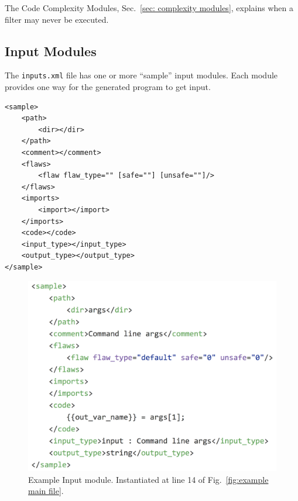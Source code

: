 The Code Complexity Modules, Sec.~\ref{sec: complexity modules}, explains when a
filter may never be executed.


\subsection{Input Modules}
\label{sec: input module}

The \verb|inputs.xml| file has one or more ``sample'' input modules.  Each module
provides one way for the generated program to get input.

\begin{verbatim}
<sample>
    <path>
        <dir></dir>
    </path>
    <comment></comment>
    <flaws>
        <flaw flaw_type="" [safe=""] [unsafe=""]/>
    </flaws>
    <imports>
        <import></import>
    </imports>
    <code></code>
    <input_type></input_type>
    <output_type></output_type>
</sample>
\end{verbatim}

\begin{figure}[tbp]
  \includegraphics{fig_Input_file.png}
  \caption{Example Input module.  Instantiated at line 14 of 
  Fig.~\ref{fig:example main file}.}
  \label{fig:example input file}
\end{figure}

